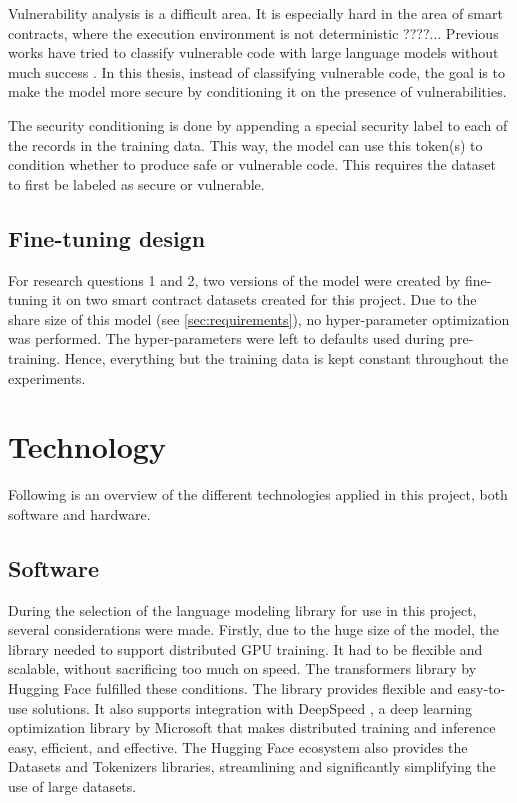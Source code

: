 Vulnerability analysis is a difficult area. It is especially hard in the area of smart contracts, where the execution environment is not deterministic ????... Previous works have tried to classify vulnerable code with large language models without much success . In this thesis, instead of classifying vulnerable code, the goal is to make the model more secure by conditioning it on the presence of vulnerabilities.

The security conditioning is done by appending a special security label to each of the records in the training data. This way, the model can use this token(s) to condition whether to produce safe or vulnerable code. This requires the dataset to first be labeled as secure or vulnerable.
\subsection{Fine-tuning design}
\label{sec:rq2-fine-tuning-design}

For research questions 1 and 2, two versions of the model were created by fine-tuning it on two smart contract datasets created for this project. Due to the share size of this model (see \cref{sec:requirements}), no hyper-parameter optimization was performed. The hyper-parameters were left to defaults used during pre-training. Hence, everything but the training data is kept constant throughout the experiments.

\section{Technology}
\label{sec:technology}
Following is an overview of the different technologies applied in this project, both software and hardware.

\subsection{Software}
\label{sec:software}
During the selection of the language modeling library for use in this project, several considerations were made. Firstly, due to the huge size of the model, the library needed to support distributed GPU training. It had to be flexible and scalable, without sacrificing too much on speed. The transformers \cite{transformers} library by Hugging Face \cite{huggingface} fulfilled these conditions. The library provides flexible and easy-to-use solutions. It also supports integration with DeepSpeed \cite{deepspeed}, a deep learning optimization library by Microsoft \cite{microsoft} that makes distributed training and inference easy, efficient, and effective. The Hugging Face ecosystem also provides the Datasets and Tokenizers libraries, streamlining and significantly simplifying the use of large datasets.

